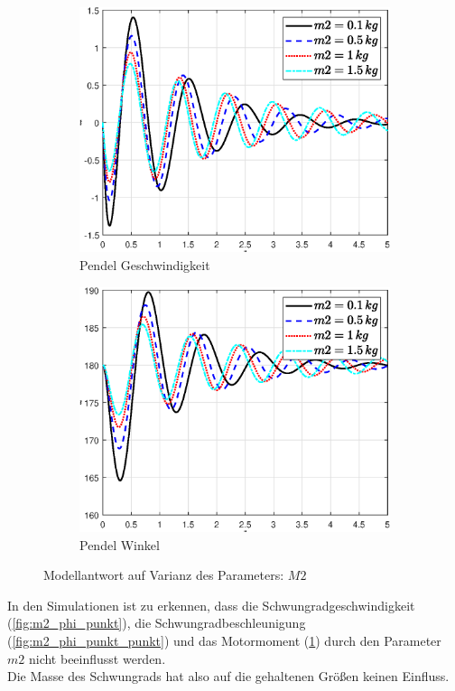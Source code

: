 \begin{figure}
\begin{subfigure}[b]{0.49\linewidth}
        \label{fig:m2_tau}
    \end{subfigure}
    \begin{subfigure}[b]{0.49\linewidth}
        \includegraphics[width=\linewidth]{Bilder/5_sensi/fig/m2/theta_punkt.eps}
        \caption{Pendel Geschwindigkeit}
        \label{fig:m2_theta_punkt}      
    \end{subfigure}
    \begin{subfigure}[b]{0.49\linewidth}
        \includegraphics[width=\linewidth]{Bilder/5_sensi/fig/m2/theta.eps}
        \caption{Pendel Winkel}
        \label{fig:m2_theta}
    \end{subfigure}
        \caption{Modellantwort auf Varianz des Parameters: $M2$}
        \label{fig:m2}
\end{figure}
In den Simulationen ist zu erkennen, dass die Schwungradgeschwindigkeit (\ref{fig:m2_phi_punkt}), die Schwungradbeschleunigung (\ref{fig:m2_phi_punkt_punkt}) und das Motormoment (\ref{fig:m2_tau}) durch den Parameter $m2$ nicht beeinflusst werden.\\
Die Masse des Schwungrads hat also auf die gehaltenen Größen keinen Einfluss.\\

